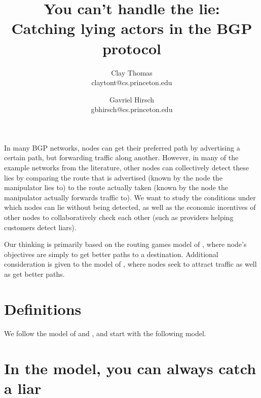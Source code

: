 \documentclass[12pt]{article}
\begin{document}

\title{
  You can't handle the lie: \\
  Catching lying actors in the BGP protocol 
}
\author{
  Clay Thomas\\ claytont@cs.princeton.edu
  \and 
  Gavriel Hirsch\\ gbhirsch@cs.princeton.edu 
}
\maketitle

In many BGP networks, nodes can get their preferred path
by advertising a certain path, but forwarding traffic along another.
However, in many of the example networks from the literature,
other nodes can collectively detect these lies
by comparing the route that is advertised (known by the node
the manipulator lies to)
to the route actually taken
(known by the node the manipulator actually forwards traffic to).
We want to study the conditions under which nodes
can lie without being detected,
as well as the economic incentives of other nodes to collaboratively
check each other (such as providers helping customers detect liars).

Our thinking is primarily based on the routing games model of
\cite{RoutingGames}, where node's objectives are simply to get
better paths to a destination.
Additional consideration is given to the model
of \cite{Attraction}, where nodes seek to attract traffic as
well as get better paths.

\section{Definitions}
  We follow the model of \cite{RoutingGames} and \cite{AgtBookDistributed},
  and start with the following model.

\section{In the \cite{RoutingGames} model, you can always catch a liar}
\end{document}
